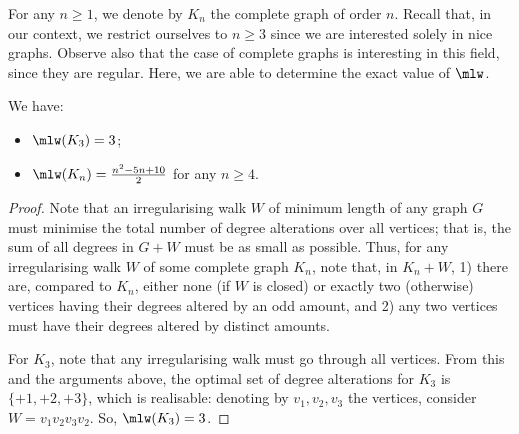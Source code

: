 \documentclass[a4paper,11pt,dvipsnames]{elsarticle}
\newcommand{\sam}[1]{\todo[size=\tiny,color=red!20!white]{\textbf{Sam:} #1}}
\newcommand{\rom}[1]{\todo[size=\tiny,color=blue!20!white]{\textbf{Rom:} #1}}
\newcommand{\sam}[1]{}
\newcommand{\rom}[1]{}
\begin{document}
For any $n \geq 1$, we denote by $K_n$ the complete graph of order $n$. Recall that, in our context, we restrict ourselves to $n \geq 3$ since we are interested solely in nice graphs. Observe also that the case of complete graphs is interesting in this field, since they are regular. Here, we are able to determine the exact value of $\mlw$.

\begin{theorem}\label{theorem:complete}
We have:
\begin{itemize}
    \item $\mlw(K_3)=3$;
    \item $\mlw(K_n)=\frac{n^2-5n+10}{2}$ for any $n \geq 4$.
\end{itemize}
\end{theorem}

\begin{proof}
Note that an irregularising walk $W$ of minimum length of any graph $G$ must minimise the total number of degree alterations over all vertices; that is, %
the sum of all degrees in $G+W$ must be as small as possible.
Thus, for any irregularising walk $W$ of some complete graph $K_n$, note that, in $K_n+W$, 1) there are, compared to $K_n$, either none (if $W$ is closed) or exactly two (otherwise) vertices having their degrees altered by an odd amount, and 2) any two vertices must have their degrees altered by distinct amounts.

For $K_3$, note that any irregularising walk must go through all vertices. From this and the arguments above, the optimal set of degree alterations for $K_3$ is $\{+1,+2,+3\}$, which is realisable: denoting by $v_1,v_2,v_3$ the vertices, consider $W=v_1v_2v_3v_2$. So, $\mlw(K_3)=3$.


\end{proof}
\end{document}
